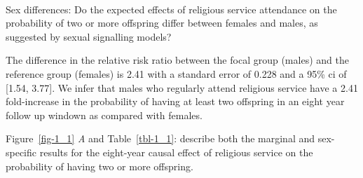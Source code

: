 \documentclass[
  single column]{article}
\makeatletter
\let\oldparagraph\paragraph
\renewcommand{\paragraph}{
    \@ifstar
      \xxxParagraphStar
      \xxxParagraphNoStar
  }
\newcommand{\xxxParagraphStar}[1]{\oldparagraph*{#1}\mbox{}}
\newcommand{\xxxParagraphNoStar}[1]{\oldparagraph{#1}\mbox{}}
\makeatother
\begin{document}
\paragraph{Sex differences: Do the expected effects of religious service
attendance on the probability of two or more offspring differ between
females and males, as suggested by sexual signalling
models?}\label{sex-differences-do-the-expected-effects-of-religious-service-attendance-on-the-probability-of-two-or-more-offspring-differ-between-females-and-males-as-suggested-by-sexual-signalling-models}

The difference in the relative risk ratio between the focal group
(males) and the reference group (females) is 2.41 with a standard error
of 0.228 and a 95\% ci of {[}1.54, 3.77{]}. We infer that males who
regularly attend religious service have a 2.41 fold-increase in the
probability of having at least two offspring in an eight year follow up
windown as compared with females.

Figure~\ref{fig-1_1} \emph{A} and Table~\ref{tbl-1_1}: describe both the
marginal and sex-specific results for the eight-year causal effect of
religious service on the probability of having two or more offspring.
\end{document}
